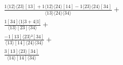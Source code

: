 \documentclass[varwidth, border=5pt]{standalone}
\begin{document}
\begin{my}
$\begin{gathered}
\scriptscriptstyle\frac{1⟨12⟩⟨23⟩[13]+1⟨12⟩⟨24⟩[14]-1⟨23⟩⟨24⟩[34]}{⟨13⟩⟨24⟩⟨34⟩} +\\
\scriptscriptstyle\frac{1[34]⟨1|3+4|1]}{⟨13⟩[23]⟨34⟩} +\\
\scriptscriptstyle\frac{-1[13]⟨23⟩²[34]}{⟨13⟩[14]⟨24⟩⟨34⟩} +\\
\scriptscriptstyle\frac{3[13]⟨23⟩[34]}{⟨14⟩[14]⟨34⟩} \phantom{+}
\end{gathered}$
\end{my}
\end{document}
